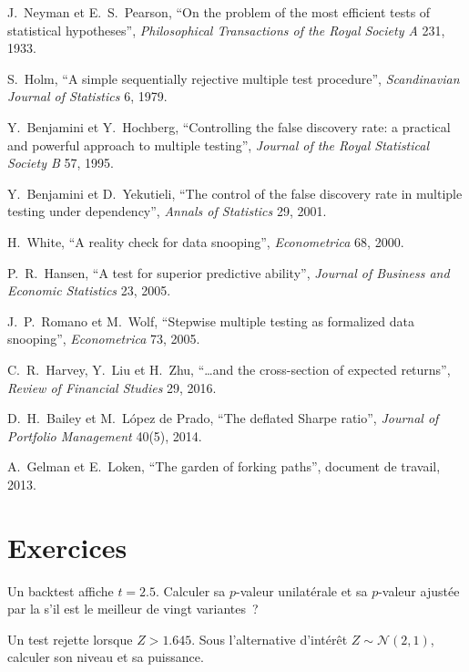 \begin{omsources}
\item J.~Neyman et E.~S.~Pearson, ``On the problem of the most efficient tests of statistical hypotheses'', \emph{Philosophical
Transactions of the Royal Society A} 231, 1933.
\item S.~Holm, ``A simple sequentially rejective multiple test procedure'', \emph{Scandinavian Journal of Statistics} 6, 1979.
\item Y.~Benjamini et Y.~Hochberg, ``Controlling the false discovery rate: a practical and powerful approach to multiple testing'',
\emph{Journal of the Royal Statistical Society B} 57, 1995.
\item Y.~Benjamini et D.~Yekutieli, ``The control of the false discovery rate in multiple testing under dependency'', \emph{Annals of
Statistics} 29, 2001.
\item H.~White, ``A reality check for data snooping'', \emph{Econometrica} 68, 2000.
\item P.~R.~Hansen, ``A test for superior predictive ability'', \emph{Journal of Business and Economic Statistics} 23, 2005.
\item J.~P.~Romano et M.~Wolf, ``Stepwise multiple testing as formalized data snooping'', \emph{Econometrica} 73, 2005.
\item C.~R.~Harvey, Y.~Liu et H.~Zhu, ``\dots and the cross-section of expected returns'', \emph{Review of Financial Studies} 29, 2016.
\item D.~H.~Bailey et M.~López de Prado, ``The deflated Sharpe ratio'', \emph{Journal of Portfolio Management} 40(5), 2014.
\item A.~Gelman et E.~Loken, ``The garden of forking paths'', document de travail, 2013.
\end{omsources}

\section{Exercices}

\begin{exercise}[$\star$]\label{exo:qm:testing-and-multiple-testing:1}
Un backtest affiche $t = 2.5$. Calculer sa $p$-valeur unilatérale et sa $p$-valeur ajustée par la 
s'il est le meilleur de vingt variantes~?
\end{exercise}

\begin{exercise}[$\star$]\label{exo:qm:testing-and-multiple-testing:2}
Un test rejette lorsque $Z > 1.645$. Sous l'alternative d'intérêt $Z \sim \mathcal N(2, 1)$, calculer son niveau et sa puissance.
\end{exercise}

